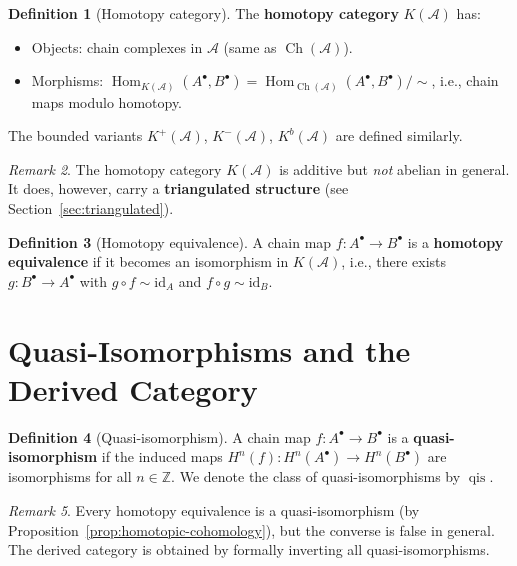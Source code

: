 \documentclass[a4paper,12pt]{book}
\DeclareMathOperator{\Hom}{Hom}
\newcommand{\id}{\mathrm{id}}
\theoremstyle{definition}
\newtheorem{definition}{Definition}[section]
\theoremstyle{plain}
\theoremstyle{remark}
\newtheorem{remark}[definition]{Remark}
\begin{document}
\begin{definition}[Homotopy category]\label{def:homotopy-category}
The \textbf{homotopy category} $K(\mathcal{A})$ has:
\begin{itemize}
    \item Objects: chain complexes in $\mathcal{A}$ (same as $\operatorname{Ch}(\mathcal{A})$).
    \item Morphisms: $\Hom_{K(\mathcal{A})}(A^\bullet, B^\bullet) =
    \Hom_{\operatorname{Ch}(\mathcal{A})}(A^\bullet, B^\bullet) / {\sim}$,
    i.e., chain maps modulo homotopy.
\end{itemize}
The bounded variants $K^+(\mathcal{A})$, $K^-(\mathcal{A})$, $K^b(\mathcal{A})$ are
defined similarly.
\end{definition}

\begin{remark}\label{rem:homotopy-not-abelian}
The homotopy category $K(\mathcal{A})$ is additive but \emph{not} abelian in general.
It does, however, carry a \textbf{triangulated structure}
(see Section~\ref{sec:triangulated}).
\end{remark}

\begin{definition}[Homotopy equivalence]\label{def:homotopy-equivalence}
A chain map $f \colon A^\bullet \to B^\bullet$ is a \textbf{homotopy equivalence} if
it becomes an isomorphism in $K(\mathcal{A})$, i.e., there exists $g \colon B^\bullet \to A^\bullet$
with $g \circ f \sim \id_A$ and $f \circ g \sim \id_B$.
\end{definition}


\section{Quasi-Isomorphisms and the Derived Category}\label{sec:derived-cat}

\begin{definition}[Quasi-isomorphism]\label{def:quasi-iso}
A chain map $f \colon A^\bullet \to B^\bullet$ is a \textbf{quasi-isomorphism} if the induced
maps $H^n(f) \colon H^n(A^\bullet) \to H^n(B^\bullet)$ are isomorphisms for all $n \in \mathbb{Z}$.
We denote the class of quasi-isomorphisms by $\operatorname{qis}$.
\end{definition}

\begin{remark}\label{rem:homotopy-vs-quasi}
Every homotopy equivalence is a quasi-isomorphism (by Proposition~\ref{prop:homotopic-cohomology}),
but the converse is false in general. The derived category is obtained by formally
inverting all quasi-isomorphisms.
\end{remark}
\end{document}
